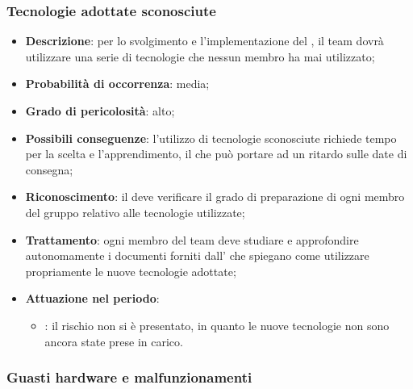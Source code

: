 \documentclass[PianoDiProgetto.tex]{subfiles}
\begin{document}
		\subsubsection{Tecnologie adottate sconosciute}
			\label{sec:tas}
		\begin{itemize}
		\item \textbf{Descrizione}: per lo svolgimento e l'implementazione del , il team dovrà utilizzare una serie di tecnologie che nessun membro ha mai utilizzato;
		\item \textbf{Probabilità di occorrenza}: media;
		\item \textbf{Grado di pericolosità}: alto;
		\item \textbf{Possibili conseguenze}: l'utilizzo di tecnologie sconosciute richiede tempo per la scelta e l'apprendimento, il che può portare ad un ritardo sulle date di consegna;
	
		\item \textbf{Riconoscimento}: il \RESP{} deve verificare il grado di preparazione di ogni membro del gruppo relativo alle tecnologie utilizzate;
		\item \textbf{Trattamento}: ogni membro del team deve studiare e approfondire autonomamente i documenti forniti dall'\AMM{} che spiegano come utilizzare propriamente le nuove tecnologie adottate;
		\item \textbf{Attuazione nel periodo}: 
			\begin{itemize}
				\item \PerAR : il rischio non si è presentato, in quanto le nuove tecnologie non sono ancora state prese in carico.
			\end{itemize}

	\end{itemize}
	
	\subsubsection{Guasti hardware e malfunzionamenti }
		\label{sec:ghs}
\end{document}
